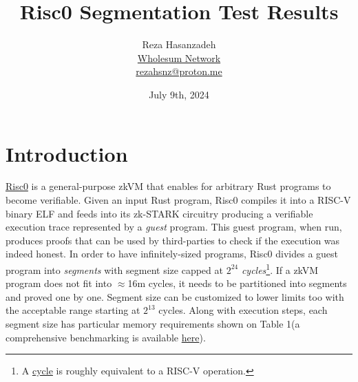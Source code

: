 \documentclass[a4paper, 10pt]{article}
\begin{document}
\title{Risc0 Segmentation Test Results}
\author{
	{Reza Hasanzadeh} \\
	\small{\href{https://github.com/WholesumNet}{Wholesum Network}} \\
	\href{mailto:rezahsnz@proton.me}{\footnotesize{rezahsnz@proton.me}}
}

\date{ \footnotesize{July 9th, 2024}}

\maketitle


\section{Introduction}
\href{https://www.risczero.com}{Risc0} is a general-purpose zkVM that enables for arbitrary Rust programs to become verifiable. Given an input Rust program, Risc0 compiles it into a RISC-V binary ELF and feeds into its zk-STARK circuitry producing a verifiable execution trace represented by a \textit{guest} program. This guest program, when run, produces proofs that can be used by third-parties to check if the execution was indeed honest. In order to have infinitely-sized programs, Risc0 divides a guest program into \textit{segments} with segment size capped at $2^{24}$ \textit{cycles}\footnote{A \href{https://dev.risczero.com/terminology\#clock-cycles}{cycle} is roughly equivalent to a RISC-V operation.}. If a zkVM program does not fit into $\approx$16m cycles, it needs to be partitioned into segments and proved one by one. Segment size can be customized to lower limits too with the acceptable range starting  at $2^{13}$ cycles. Along with execution steps, each segment size has particular memory requirements shown on Table 1(a comprehensive benchmarking is available \href{https://benchmarks.risczero.com/release-1.0/datasheet}{here}).
\end{document}
